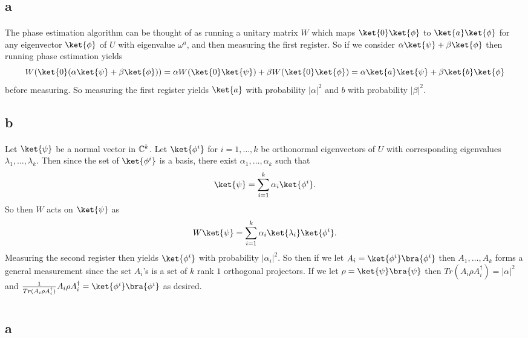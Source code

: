 \documentclass[letterpaper,12pt,oneside,onecolumn]{article}
\begin{document}
\section{}
\subsection{a}
\paragraph{}
The phase estimation algorithm can be thought of as running a unitary matrix $W$ which maps $\ket{0}\ket{\phi}$ to $\ket{a}\ket{\phi}$ for any eigenvector $\ket{\phi}$ of $U$ with eigenvalue $\omega^a$, and then measuring the first register. So if we consider $\alpha\ket{\psi} + \beta\ket{\phi}$ then running phase estimation yields
$$W(\ket{0}(\alpha\ket{\psi} + \beta\ket{\phi})) = \alpha W(\ket{0}\ket{\psi}) + \beta W(\ket{0}\ket{\phi}) = \alpha \ket{a}\ket{\psi} + \beta\ket{b}\ket{\phi}$$
before measuring. So measuring the first register yields $\ket{a}$ with probability $|\alpha|^2$ and $b$ with probability $|\beta|^2$.
\subsection{b}
\paragraph{}
Let $\ket{\psi}$ be a normal vector in $\mathbb{C}^k$. Let $\ket{\phi^i}$ for $i=1,\dots, k$ be orthonormal eigenvectors of $U$ with corresponding eigenvalues $\lambda_1, \dots, \lambda_k$. Then since the set of $\ket{\phi^i}$ is a basis, there exist $\alpha_1, \dots, \alpha_k$ such that
$$\ket{\psi} = \sum_{i=1}^k \alpha_i \ket{\phi^i}.$$
So then $W$ acts on $\ket{\psi}$ as
$$W\ket{\psi} = \sum_{i=1}^k \alpha_i \ket{\lambda_i}\ket{\phi^i}.$$
Measuring the second register then yields $\ket{\phi^i}$ with probability $|\alpha_i|^2$. So then if we let $A_i = \ket{\phi^i}\bra{\phi^i}$ then $A_1, \dots, A_k$ forms a general measurement since the set $A_i$'s is a set of $k$ rank $1$ orthogonal projectors. If we let $\rho = \ket{\psi}\bra{\psi}$ then $Tr(A_i\rho A_i^\dagger) = |\alpha|^2$ and $\frac{1}{Tr(A_i\rho A_i^\dagger)} A_i \rho A_i^\dagger = \ket{\phi^i}\bra{\phi^i}$ as desired.
\section{}
\subsection{a}
\end{document}
